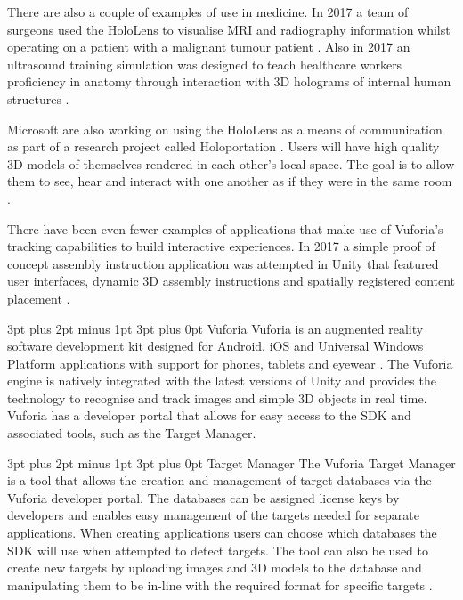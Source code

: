 \documentclass[12pt,a4paper]{article}
\makeatletter
\renewcommand\paragraph{\@startsection {paragraph}{1}{0mm} %
	                           {3pt plus 2pt minus 1pt} %
	                           {3pt plus 0pt} %
	                           {\normalfont}}
\renewcommand\subsubsection{\@startsection {subsubsection}{1}{0mm} %
	                           {3pt plus 2pt minus 1pt} %
	                           {3pt plus 0pt} %
	                           {\normalfont\bfseries}}
\makeatother
\begin{document}
There are also a couple of examples of use in medicine. In 2017 a team of surgeons used the HoloLens to visualise MRI and radiography information whilst operating on a patient with a malignant tumour patient \cite{bernardo17, 3ders17}. Also in 2017 an ultrasound training simulation was designed to teach healthcare workers proficiency in anatomy through interaction with 3D holograms of internal human structures \cite{lynn17, mahmood17}.

Microsoft are also working on using the HoloLens as a means of communication as part of a research project called Holoportation \cite{cutler17}. Users will have high quality 3D models of themselves rendered in each other's local space. The goal is to allow them to see, hear and interact with one another as if they were in the same room \cite{orts16}.

There have been even fewer examples of applications that make use of Vuforia's tracking capabilities to build interactive experiences. In 2017 a simple proof of concept assembly instruction application was attempted in Unity that featured user interfaces, dynamic 3D assembly instructions and spatially registered content placement \cite{evans17}.

\subsubsection{Vuforia}
Vuforia is an augmented reality software development kit designed for Android, iOS and Universal Windows Platform applications with support for phones, tablets and eyewear \cite{vuforia, vuforiaeyewear}. The Vuforia engine is natively integrated with the latest versions of Unity and provides the technology to recognise and track images and simple 3D objects in real time. Vuforia has a developer portal that allows for easy access to the SDK and associated tools, such as the Target Manager.

\paragraph{Target Manager}
The Vuforia Target Manager is a tool that allows the creation and management of target databases via the Vuforia developer portal. The databases can be assigned license keys by developers and enables easy management of the targets needed for separate applications. When creating applications users can choose which databases the SDK will use when attempted to detect targets. The tool can also be used to create new targets by uploading images and 3D models to the database and manipulating them to be in-line with the required format for specific targets \cite{vuforiatargetmanager}. 
\end{document}
